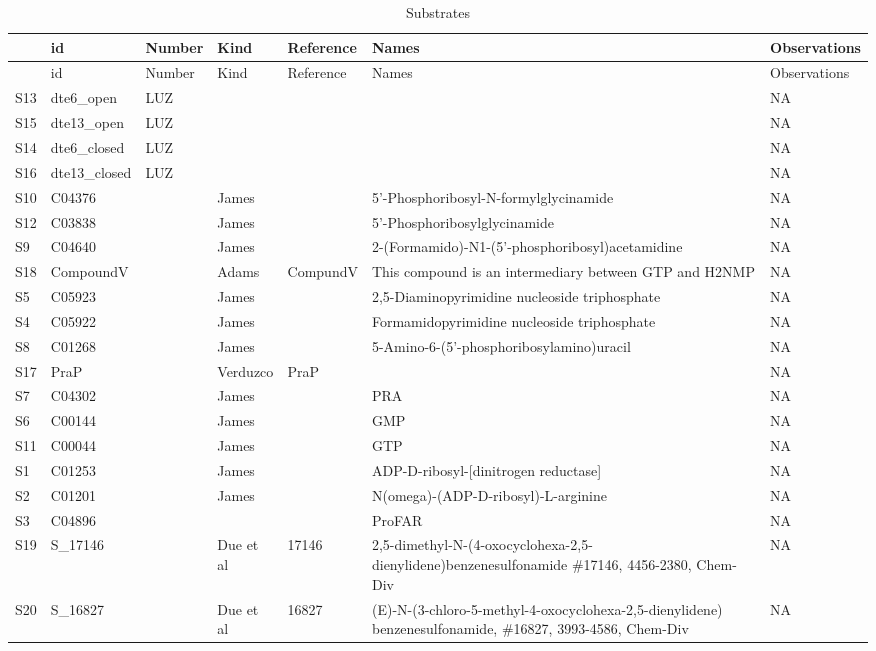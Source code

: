 \documentclass[12pt,twoside]{reedthesis}
\begin{document}
  \begin{longtable}[c]{@{}lllllll@{}}
  \caption{Substrates \label{tab:substrates}}\tabularnewline
  \toprule
  & id & Number & Kind & Reference & Names & Observations\tabularnewline
  \midrule
  \endfirsthead
  \toprule
  & id & Number & Kind & Reference & Names & Observations\tabularnewline
  \midrule
  \endhead
  S13 & dte6\_open & LUZ & & & & NA\tabularnewline
  S15 & dte13\_open & LUZ & & & & NA\tabularnewline
  S14 & dte6\_closed & LUZ & & & & NA\tabularnewline
  S16 & dte13\_closed & LUZ & & & & NA\tabularnewline
  S10 & C04376 & & James & & 5'-Phosphoribosyl-N-formylglycinamide &
  NA\tabularnewline
  S12 & C03838 & & James & & 5'-Phosphoribosylglycinamide &
  NA\tabularnewline
  S9 & C04640 & & James & &
  2-(Formamido)-N1-(5'-phosphoribosyl)acetamidine & NA\tabularnewline
  S18 & CompoundV & & Adams & CompundV & This compound is an intermediary
  between GTP and H2NMP & NA\tabularnewline
  S5 & C05923 & & James & & 2,5-Diaminopyrimidine nucleoside triphosphate
  & NA\tabularnewline
  S4 & C05922 & & James & & Formamidopyrimidine nucleoside triphosphate &
  NA\tabularnewline
  S8 & C01268 & & James & & 5-Amino-6-(5'-phosphoribosylamino)uracil &
  NA\tabularnewline
  S17 & PraP & & Verduzco & PraP & & NA\tabularnewline
  S7 & C04302 & & James & & PRA & NA\tabularnewline
  S6 & C00144 & & James & & GMP & NA\tabularnewline
  S11 & C00044 & & James & & GTP & NA\tabularnewline
  S1 & C01253 & & James & & ADP-D-ribosyl-{[}dinitrogen reductase{]} &
  NA\tabularnewline
  S2 & C01201 & & James & & N(omega)-(ADP-D-ribosyl)-L-arginine &
  NA\tabularnewline
  S3 & C04896 & & & & ProFAR & NA\tabularnewline
  S19 & S\_17146 & & Due et al & 17146 &
  2,5-dimethyl-N-(4-oxocyclohexa-2,5-dienylidene)benzenesulfonamide
  \#17146, 4456-2380, Chem-Div & NA\tabularnewline
  S20 & S\_16827 & & Due et al & 16827 &
  (E)-N-(3-chloro-5-methyl-4-oxocyclohexa-2,5-dienylidene)
  benzenesulfonamide, \#16827, 3993-4586, Chem-Div & NA\tabularnewline
  \bottomrule
  \end{longtable}
  
\end{document}
